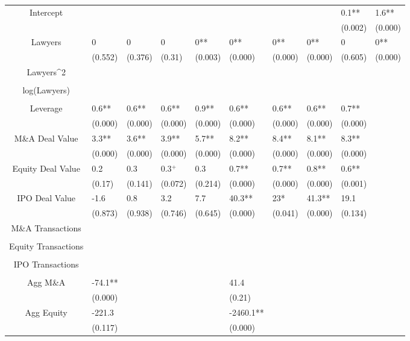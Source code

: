 \documentclass{article}
\begin{document}
\begin{table}[H]
\begin{tabular}{|clllllllll|}
Intercept &  &  &  &  &  &  &  & 0.1** & 1.6** \\ 
   &  &  &  &  &  &  &  & (0.002) & (0.000) \\ 
  Lawyers & 0 & 0 & 0 & 0** & 0** & 0** & 0** & 0 & 0** \\ 
   & (0.552) & (0.376) & (0.31) & (0.003) & (0.000) & (0.000) & (0.000) & (0.605) & (0.000) \\ 
  Lawyers^2 &  &  &  &  &  &  &  &  &  \\ 
   &  &  &  &  &  &  &  &  &  \\ 
  log(Lawyers) &  &  &  &  &  &  &  &  &  \\ 
   &  &  &  &  &  &  &  &  &  \\ 
  Leverage & 0.6** & 0.6** & 0.6** & 0.9** & 0.6** & 0.6** & 0.6** & 0.7** &  \\ 
   & (0.000) & (0.000) & (0.000) & (0.000) & (0.000) & (0.000) & (0.000) & (0.000) &  \\ 
  M\&A Deal Value & 3.3** & 3.6** & 3.9** & 5.7** & 8.2** & 8.4** & 8.1** & 8.3** &  \\ 
   & (0.000) & (0.000) & (0.000) & (0.000) & (0.000) & (0.000) & (0.000) & (0.000) &  \\ 
  Equity Deal Value & 0.2 & 0.3 & 0.3$^{+}$ & 0.3 & 0.7** & 0.7** & 0.8** & 0.6** &  \\ 
   & (0.17) & (0.141) & (0.072) & (0.214) & (0.000) & (0.000) & (0.000) & (0.001) &  \\ 
  IPO Deal Value & -1.6 & 0.8 & 3.2 & 7.7 & 40.3** & 23* & 41.3** & 19.1 &  \\ 
   & (0.873) & (0.938) & (0.746) & (0.645) & (0.000) & (0.041) & (0.000) & (0.134) &  \\ 
  M\&A Transactions &  &  &  &  &  &  &  &  &  \\ 
   &  &  &  &  &  &  &  &  &  \\ 
  Equity Transactions &  &  &  &  &  &  &  &  &  \\ 
   &  &  &  &  &  &  &  &  &  \\ 
  IPO Transactions &  &  &  &  &  &  &  &  &  \\ 
   &  &  &  &  &  &  &  &  &  \\ 
  Agg M\&A & -74.1** &  &  &  & 41.4 &  &  &  &  \\ 
   & (0.000) &  &  &  & (0.21) &  &  &  &  \\ 
  Agg Equity & -221.3 &  &  &  & -2460.1** &  &  &  &  \\ 
   & (0.117) &  &  &  & (0.000) &  &  &  &  \\ 

\end{tabular}
\end{table}
\end{document}
